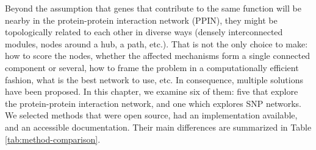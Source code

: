 \documentclass[
  11pt,
]{env/yjiao}
\begin{document}
Beyond the assumption that genes that contribute to the same function
will be nearby in the protein-protein interaction network (PPIN), they
might be topologically related to each other in diverse ways (densely
interconnected modules, nodes around a hub, a path, etc.). That is not
the only choice to make: how to score the nodes, whether the affected
mechanisms form a single connected component or several, how to frame
the problem in a computationally efficient fashion, what is the best
network to use, etc. In consequence, multiple solutions have been
proposed. In this chapter, we examine six of them: five that explore the
protein-protein interaction network, and one which explores SNP
networks. We selected methods that were open source, had an
implementation available, and an accessible documentation. Their main
differences are summarized in Table \ref{tab:method-comparison}.
\end{document}
